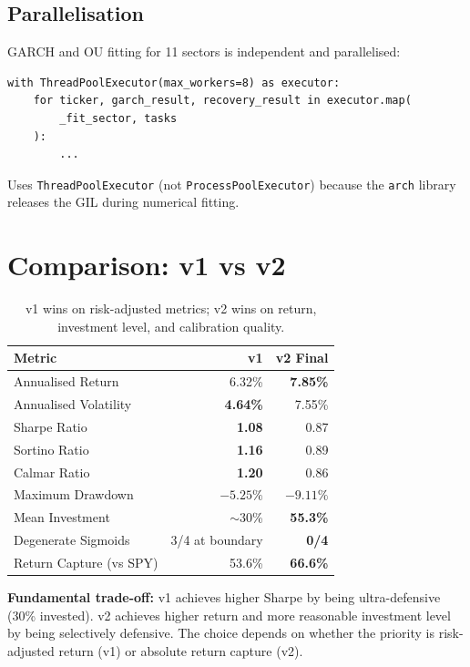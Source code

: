\documentclass[11pt,a4paper]{article}
\begin{document}
\subsection{Parallelisation}

GARCH and OU fitting for 11 sectors is independent and parallelised:
\begin{verbatim}
with ThreadPoolExecutor(max_workers=8) as executor:
    for ticker, garch_result, recovery_result in executor.map(
        _fit_sector, tasks
    ):
        ...
\end{verbatim}
Uses \texttt{ThreadPoolExecutor} (not \texttt{ProcessPoolExecutor}) because the \texttt{arch} library releases the GIL during numerical fitting.

\section{Comparison: v1 vs v2}
\label{sec:comparison}

\begin{table}[h]
\centering
\begin{tabular}{lrr}
\toprule
\textbf{Metric} & \textbf{v1} & \textbf{v2 Final} \\
\midrule
Annualised Return & 6.32\% & \textbf{7.85\%} \\
Annualised Volatility & \textbf{4.64\%} & 7.55\% \\
Sharpe Ratio & \textbf{1.08} & 0.87 \\
Sortino Ratio & \textbf{1.16} & 0.89 \\
Calmar Ratio & \textbf{1.20} & 0.86 \\
Maximum Drawdown & $\mathbf{-5.25\%}$ & $-9.11\%$ \\
Mean Investment & $\sim$30\% & \textbf{55.3\%} \\
Degenerate Sigmoids & 3/4 at boundary & \textbf{0/4} \\
Return Capture (vs SPY) & 53.6\% & \textbf{66.6\%} \\
\bottomrule
\end{tabular}
\caption{v1 wins on risk-adjusted metrics; v2 wins on return, investment level, and calibration quality.}
\label{tab:v1-v2}
\end{table}

\textbf{Fundamental trade-off:} v1 achieves higher Sharpe by being ultra-defensive (30\% invested). v2 achieves higher return and more reasonable investment level by being selectively defensive. The choice depends on whether the priority is risk-adjusted return (v1) or absolute return capture (v2).
\end{document}
